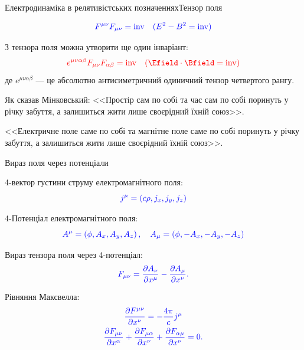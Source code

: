 \documentclass[]{beamer}
\begin{document}
\begin{frame}{Електродинаміка в релятивістських позначеннях}{Тензор поля}
\begin{overprint}
	\begin{equation*}\color{blue}
		F^{\mu\nu}F_{\mu\nu} = \mathrm{inv} \quad (E^2 - B^2 =  \mathrm{inv})
	\end{equation*}

	З тензора поля можна утворити ще один інваріант:
	\begin{equation*}\color{red}
		e^{\mu\nu\alpha\beta}F_{\mu\nu}F_{\alpha\beta} = \mathrm{inv}  \quad (\Efield\cdot\Bfield = \mathrm{inv})
	\end{equation*}
	де $  e^{\mu\nu\alpha\beta}$ --- це абсолютно антисиметричний одиничний тензор четвертого рангу.
	\onslide<2>
	\begin{block}{}
		Як сказав Мінковський: <<Простір сам по собі та час сам по собі поринуть у річку забуття, а залишиться жити лише своєрідний їхній союз>>.
	\end{block}
	\begin{block}{}
		<<Електричне поле саме по собі та магнітне поле саме по собі поринуть у річку забуття, а залишиться жити лише своєрідний їхній союз>>.
	\end{block}

\end{overprint}


\end{frame}





\begin{frame}{Вираз поля через потенціали}{}

	4-вектор густини струму електромагнітного поля:
	\begin{equation*}\color{blue}
		j^{\mu} = \left( c\rho, {j}_x, {j}_y, {j}_z \right)
	\end{equation*}

	4-Потенціал електромагнітного поля:
	\begin{equation*}\color{blue}
		A^{\mu} = \left( \phi, {A}_x, {A}_y, {A}_z \right), \quad A_{\mu} = \left( \phi, -{A}_x, -{A}_y, -{A}_z \right)
	\end{equation*}

	Вираз тензора поля через 4-потенціал:
	\begin{equation*}\color{blue}
		F_{\mu\nu} = \frac{\partial A_{\nu}}{\partial x^{\mu}} - \frac{\partial A_{\mu}}{\partial x^{\nu}}.
	\end{equation*}

	Рівняння Максвелла:
	\begin{gather*}\color{blue}
		\frac{\partial F^{\mu\nu}}{\partial x^\nu} =                                                                                -\frac{4\pi}{c}j^\mu \\
		\color{blue}
		\frac{\partial F_{\mu\nu}}{\partial x^\alpha} + \frac{\partial F_{\mu\alpha}}{\partial x^\nu} +\frac{\partial F_{\alpha\mu}}{\partial x^\nu}  = 0.
	\end{gather*}

\end{frame}
\end{document}
